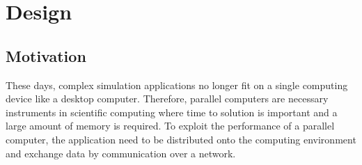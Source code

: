 \chapter{Design}
\label{sec:design}



\section{Motivation}


These days, complex simulation applications no longer fit on a single
computing device like a desktop computer. Therefore, parallel
computers are necessary instruments in scientific computing where time
to solution is important and a large amount of memory is required.  To
exploit the performance of a parallel computer, the application need
to be distributed onto the computing environment and exchange data by
communication over a network.

